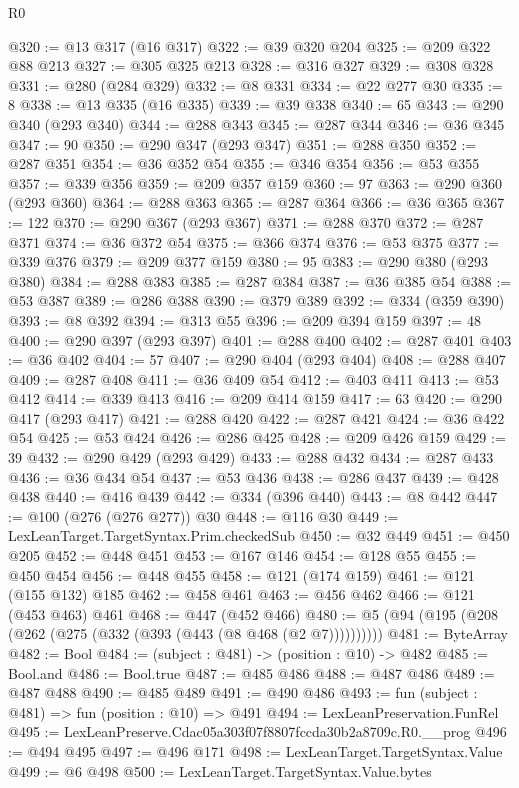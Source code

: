 \begin{lexlean}{R0}
\begin{coremodule}
@320 := @13 @317 (@16 @317)
@322 := @39 @320 @204
@325 := @209 @322 @88 @213
@327 := @305 @325 @213
@328 := @316 @327
@329 := @308 @328
@331 := @280 (@284 @329)
@332 := @8 @331
@334 := @22 @277 @30
@335 := 8
@338 := @13 @335 (@16 @335)
@339 := @39 @338
@340 := 65
@343 := @290 @340 (@293 @340)
@344 := @288 @343
@345 := @287 @344
@346 := @36 @345
@347 := 90
@350 := @290 @347 (@293 @347)
@351 := @288 @350
@352 := @287 @351
@354 := @36 @352 @54
@355 := @346 @354
@356 := @53 @355
@357 := @339 @356
@359 := @209 @357 @159
@360 := 97
@363 := @290 @360 (@293 @360)
@364 := @288 @363
@365 := @287 @364
@366 := @36 @365
@367 := 122
@370 := @290 @367 (@293 @367)
@371 := @288 @370
@372 := @287 @371
@374 := @36 @372 @54
@375 := @366 @374
@376 := @53 @375
@377 := @339 @376
@379 := @209 @377 @159
@380 := 95
@383 := @290 @380 (@293 @380)
@384 := @288 @383
@385 := @287 @384
@387 := @36 @385 @54
@388 := @53 @387
@389 := @286 @388
@390 := @379 @389
@392 := @334 (@359 @390)
@393 := @8 @392
@394 := @313 @55
@396 := @209 @394 @159
@397 := 48
@400 := @290 @397 (@293 @397)
@401 := @288 @400
@402 := @287 @401
@403 := @36 @402
@404 := 57
@407 := @290 @404 (@293 @404)
@408 := @288 @407
@409 := @287 @408
@411 := @36 @409 @54
@412 := @403 @411
@413 := @53 @412
@414 := @339 @413
@416 := @209 @414 @159
@417 := 63
@420 := @290 @417 (@293 @417)
@421 := @288 @420
@422 := @287 @421
@424 := @36 @422 @54
@425 := @53 @424
@426 := @286 @425
@428 := @209 @426 @159
@429 := 39
@432 := @290 @429 (@293 @429)
@433 := @288 @432
@434 := @287 @433
@436 := @36 @434 @54
@437 := @53 @436
@438 := @286 @437
@439 := @428 @438
@440 := @416 @439
@442 := @334 (@396 @440)
@443 := @8 @442
@447 := @100 (@276 (@276 @277)) @30
@448 := @116 @30
@449 := LexLeanTarget.TargetSyntax.Prim.checkedSub
@450 := @32 @449
@451 := @450 @205
@452 := @448 @451
@453 := @167 @146
@454 := @128 @55
@455 := @450 @454
@456 := @448 @455
@458 := @121 (@174 @159)
@461 := @121 (@155 @132) @185
@462 := @458 @461
@463 := @456 @462
@466 := @121 (@453 @463) @461
@468 := @447 (@452 @466)
@480 := @5 (@94 (@195 (@208 (@262 (@275 (@332 (@393 (@443 (@8 @468 (@2 @7))))))))))
@481 := ByteArray
@482 := Bool
@484 := (subject : @481) -> (position : @10) -> @482
@485 := Bool.and
@486 := Bool.true
@487 := @485 @486
@488 := @487 @486
@489 := @487 @488
@490 := @485 @489
@491 := @490 @486
@493 := fun (subject : @481) => fun (position : @10) => @491
@494 := LexLeanPreservation.FunRel
@495 := LexLeanPreserve.Cdac05a303f07f8807fccda30b2a8709c.R0.__prog
@496 := @494 @495
@497 := @496 @171
@498 := LexLeanTarget.TargetSyntax.Value
@499 := @6 @498
@500 := LexLeanTarget.TargetSyntax.Value.bytes

\end{coremodule}
\end{lexlean}
